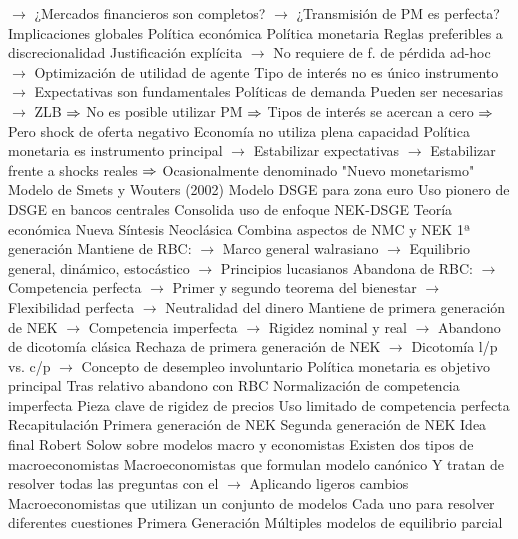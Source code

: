 \documentclass{nuevotema}
\begin{document}
\begin{esquemal}
				\4[] $\to$ ¿Mercados financieros son completos?
				\4[] $\to$ ¿Transmisión de PM es perfecta?
		\2 Implicaciones globales
			\3 Política económica
				\4 Política monetaria
				\4[] Reglas preferibles a discrecionalidad
				\4[] Justificación explícita
				\4[] $\to$ No requiere de f. de pérdida ad-hoc
				\4[] $\to$ Optimización de utilidad de agente
				\4[] Tipo de interés no es único instrumento
				\4[] $\to$ Expectativas son fundamentales
				\4 Políticas de demanda
				\4[] Pueden ser necesarias
				\4[] $\to$ ZLB
				\4[] $\Rightarrow$ No es posible utilizar PM
				\4[] $\Rightarrow$ Tipos de interés se acercan a cero
				\4[] $\Rightarrow$ Pero shock de oferta negativo
				\4[] Economía no utiliza plena capacidad
				\4[] Política monetaria es instrumento principal
				\4[] $\to$ Estabilizar expectativas
				\4[] $\to$ Estabilizar frente a shocks reales
				\4[] $\Rightarrow$ Ocasionalmente denominado "Nuevo monetarismo"
				\4 Modelo de Smets y Wouters (2002)
				\4[] Modelo DSGE para zona euro
				\4[] Uso pionero de DSGE en bancos centrales
				\4[] Consolida uso de enfoque NEK-DSGE
			\3 Teoría económica
				\4 Nueva Síntesis Neoclásica
				\4[] Combina aspectos de NMC y NEK 1ª generación
				\4[] Mantiene de RBC:
				\4[] $\to$ Marco general walrasiano
				\4[] $\to$ Equilibrio general, dinámico, estocástico
				\4[] $\to$ Principios lucasianos
				\4[] Abandona de RBC:
				\4[] $\to$ Competencia perfecta
				\4[] $\to$ Primer y segundo teorema del bienestar
				\4[] $\to$ Flexibilidad perfecta
				\4[] $\to$ Neutralidad del dinero
				\4[] Mantiene de primera generación de NEK
				\4[] $\to$ Competencia imperfecta
				\4[] $\to$ Rigidez nominal y real
				\4[] $\to$ Abandono de dicotomía clásica
				\4[] Rechaza de primera generación de NEK
				\4[] $\to$ Dicotomía l/p vs. c/p
				\4[] $\to$ Concepto de desempleo involuntario
				\4 Política monetaria es objetivo principal
				\4[] Tras relativo abandono con RBC
				\4 Normalización de competencia imperfecta
				\4[] Pieza clave de rigidez de precios
				\4[] Uso limitado de competencia perfecta
	\1[] 
		\2 Recapitulación
			\3 Primera generación de NEK
			\3 Segunda generación de NEK
		\2 Idea final
			\3 Robert Solow sobre modelos macro y economistas
				\4 Existen dos tipos de macroeconomistas
				\4 Macroeconomistas que formulan modelo canónico
				\4[] Y tratan de resolver todas las preguntas con el
				\4[] $\to$ Aplicando ligeros cambios
				\4 Macroeconomistas que utilizan un conjunto de modelos
				\4[] Cada uno para resolver diferentes cuestiones
				\4 Primera Generación
				\4[] Múltiples modelos de equilibrio parcial

\end{esquemal}
\end{document}
